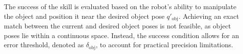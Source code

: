 
The success of the skill is evaluated based on the robot's ability to manipulate the object and position it near the desired object pose \( q'_{\text{obj}} \). Achieving an exact match between the current and desired object poses is not feasible, as object poses lie within a continuous space. Instead, the success condition allows for an error threshold, denoted as \( \delta_\text{obj} \), to account for practical precision limitations.

